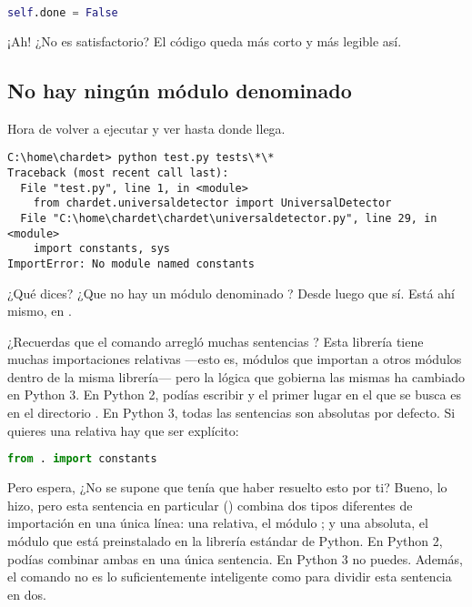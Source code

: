 \begin{lstlisting}[language=Python,breaklines=true]
self.done = False
\end{lstlisting}

¡Ah! ¿No es satisfactorio? El código queda más corto y más legible así.

\subsection{No hay ningún módulo denominado }

Hora de volver a ejecutar  y ver hasta donde llega.

\noindent\begin{minipage}{\textwidth}
\begin{lstlisting}[breaklines=true]
C:\home\chardet> python test.py tests\*\*
Traceback (most recent call last):
  File "test.py", line 1, in <module>
    from chardet.universaldetector import UniversalDetector
  File "C:\home\chardet\chardet\universaldetector.py", line 29, in <module>
    import constants, sys
ImportError: No module named constants
\end{lstlisting}
\end{minipage}

¿Qué dices? ¿Que no hay un módulo denominado ? Desde luego que sí. Está ahí mismo, en .

¿Recuerdas que el comando  arregló muchas sentencias ? Esta librería tiene muchas importaciones relativas ---esto es, módulos que importan a otros módulos dentro de la misma librería--- pero la lógica que gobierna las mismas ha cambiado en Python 3. En Python 2, podías escribir  y el primer lugar en el que se busca es en el directorio . En Python 3, todas las sentencias  son absolutas por defecto. Si quieres una relativa hay que ser explícito:

\begin{lstlisting}[language=Python,breaklines=true]
from . import constants
\end{lstlisting}

Pero espera, ¿No se supone que  tenía que haber resuelto esto por ti? Bueno, lo hizo, pero esta sentencia en particular () combina dos tipos diferentes de importación en una única línea: una relativa, el módulo ; y una absoluta, el módulo  que está preinstalado en la librería estándar de Python. En Python 2, podías combinar ambas en una única sentencia. En Python 3 no puedes. Además, el comando  no es lo suficientemente inteligente como para dividir esta sentencia en dos.

